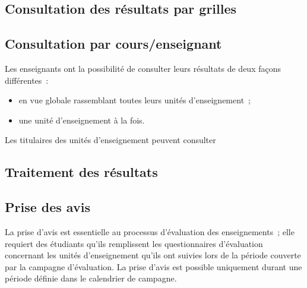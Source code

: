 \documentclass[a4paper,11pt]{report}
\begin{document}
\subsection{Consultation des résultats par grilles}






\subsection{Consultation par cours/enseignant}
Les enseignants ont la possibilité de consulter leurs résultats de deux façons différentes~:
\begin{itemize}
	\item en vue globale rassemblant toutes leurs unités d'enseignement~;
	\item une unité d'enseignement à la fois.
\end{itemize}

Les titulaires des unités d'enseignement peuvent consulter






\subsection{Traitement des résultats}






\subsection{Prise des avis}
La prise d'avis est essentielle au processus d'évaluation des enseignements~; elle requiert des étudiants qu'ils remplissent les questionnaires d'évaluation concernant les unités d'enseignement qu'ils ont suivies lors de la période couverte par la campagne d'évaluation. %
La prise d'avis est possible uniquement durant une période définie dans le calendrier de campagne.
\end{document}
